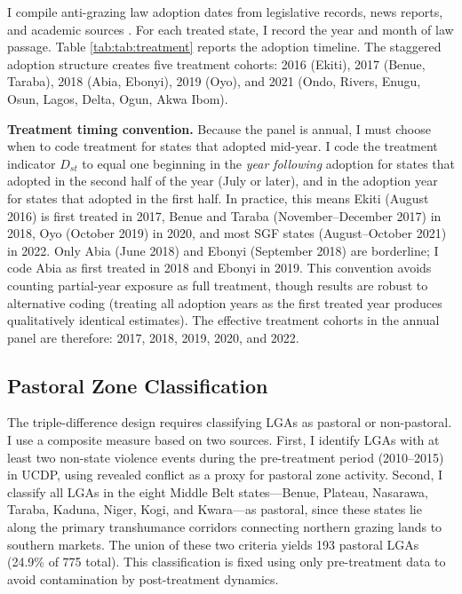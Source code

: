 \documentclass[12pt]{article}
\begin{document}
I compile anti-grazing law adoption dates from legislative records, news reports, and academic sources \citep{ajala2020anti, ochonu2022anti}. For each treated state, I record the year and month of law passage. Table \ref{tab:tab:treatment} reports the adoption timeline. The staggered adoption structure creates five treatment cohorts: 2016 (Ekiti), 2017 (Benue, Taraba), 2018 (Abia, Ebonyi), 2019 (Oyo), and 2021 (Ondo, Rivers, Enugu, Osun, Lagos, Delta, Ogun, Akwa Ibom).

\textbf{Treatment timing convention.} Because the panel is annual, I must choose when to code treatment for states that adopted mid-year. I code the treatment indicator $D_{st}$ to equal one beginning in the \textit{year following} adoption for states that adopted in the second half of the year (July or later), and in the adoption year for states that adopted in the first half. In practice, this means Ekiti (August 2016) is first treated in 2017, Benue and Taraba (November--December 2017) in 2018, Oyo (October 2019) in 2020, and most SGF states (August--October 2021) in 2022. Only Abia (June 2018) and Ebonyi (September 2018) are borderline; I code Abia as first treated in 2018 and Ebonyi in 2019. This convention avoids counting partial-year exposure as full treatment, though results are robust to alternative coding (treating all adoption years as the first treated year produces qualitatively identical estimates). The effective treatment cohorts in the annual panel are therefore: 2017, 2018, 2019, 2020, and 2022.

\subsection{Pastoral Zone Classification}

The triple-difference design requires classifying LGAs as pastoral or non-pastoral. I use a composite measure based on two sources. First, I identify LGAs with at least two non-state violence events during the pre-treatment period (2010--2015) in UCDP, using revealed conflict as a proxy for pastoral zone activity. Second, I classify all LGAs in the eight Middle Belt states---Benue, Plateau, Nasarawa, Taraba, Kaduna, Niger, Kogi, and Kwara---as pastoral, since these states lie along the primary transhumance corridors connecting northern grazing lands to southern markets. The union of these two criteria yields 193 pastoral LGAs (24.9\% of 775 total). This classification is fixed using only pre-treatment data to avoid contamination by post-treatment dynamics.
\end{document}
